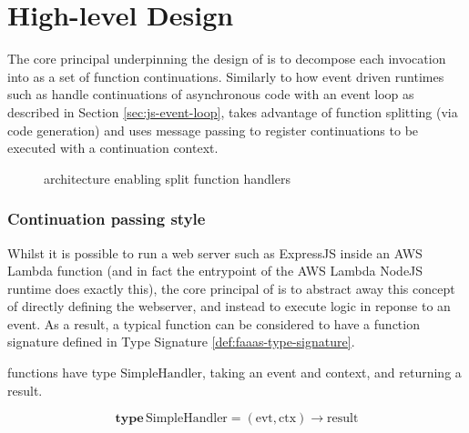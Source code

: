 \section{High-level Design}
The core principal underpinning the design of \faaas{} is to decompose each \faas{} invocation into as a set of function continuations. Similarly to how event driven runtimes such as \js{} handle continuations of asynchronous code with an event loop as described in Section \ref{sec:js-event-loop}, \faaas{} takes advantage of function splitting (via code generation) and uses message passing to register continuations to be executed with a continuation context.

\begin{figure}[htp]
    \centering
    \quad
    \caption{\faas{} architecture enabling split function handlers}
\end{figure}

\subsubsection{Continuation passing style}
Whilst it is possible to run a web server such as ExpressJS inside an AWS Lambda function (and in fact the entrypoint of the AWS Lambda NodeJS runtime does exactly this), the core principal of \faas{} is to abstract away this concept of directly defining the webserver, and instead to execute logic in reponse to an event. As a result, a typical \faas{} function can be considered to have a function signature defined in Type Signature \ref{def:faaas-type-signature}.

\begin{signature}
\label{def:faaas-type-signature}
\faas{} functions have type $\textrm{SimpleHandler}$, taking an event and context, and returning a result.

$$\textbf{type}\, \textrm{SimpleHandler} = (\textrm{evt}, \textrm{ctx}) \rightarrow \textrm{result}$$
\end{signature}

